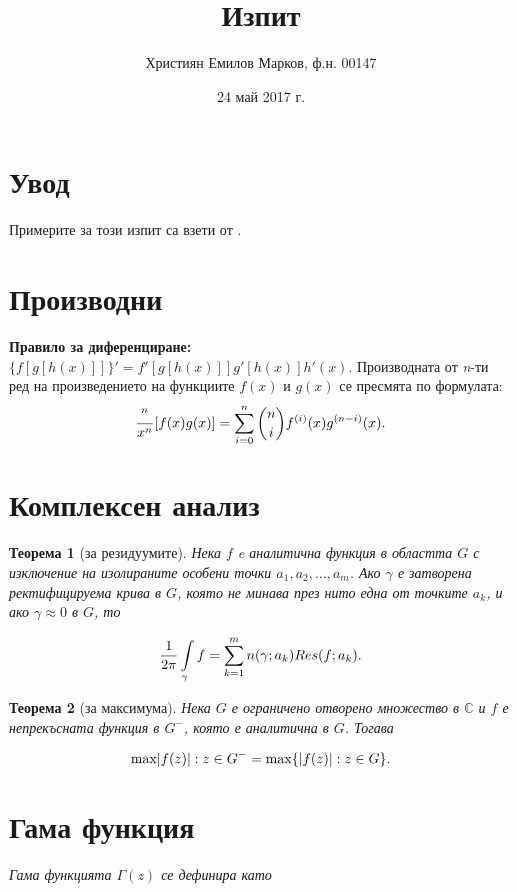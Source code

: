 \documentclass[leqno,11pt]{article}
\title{Изпит}
\author{Християн Емилов Марков, ф.н. 00147}
\date{24 май 2017 г.}
\newtheorem{theorem}{Теорема}
\let\partial\relax
\DeclareMathOperator{\partial}{d}
\let\i\relax
\DeclareMathOperator{\i}{i}
\begin{document}
\maketitle

\tableofcontents
\section*{Увод}
Примерите за този изпит са взети от \cite{sitectan}.
\section{Производни}
\textbf{Правило за диференциране:}
$\{f[g[h(x)]]\}' = f'[g[h(x)]]g'[h(x)]h'(x)$.
Производната от \textit{n}-ти ред на произведението на функциите $f(x)$ и $g(x)$ се пресмята по формулата:
\begin{equation}\label{eq:one}
\frac{\partial^n}{\partial x^n}[f(x)g(x)] = \sum\limits_{i=0}^{n}\binom{n}{i}f^{(i)}(x)g^{(n-i)}(x).
\end{equation}
\section{Комплексен анализ}
\begin{theorem}[за резидуумите]\label{th:one}
Нека $f$ e аналитична функция в областта $G$ с изключение на изолираните особени точки $a_1, a_2, \dots, a_m$. Ако $\gamma$ е затворена ректифицируема крива в $G$, която не минава през нито една от точките $a_k$, и ако $\gamma \approx 0$ в $G$, то
\end{theorem}
\begin{equation}
\frac{1}{2\pi \i} \int\limits_{\gamma}f = \sum\limits_{k=1}^{m}n(\gamma;a_{k})Res(f;a_k).
\end{equation}
\begin{theorem}[за максимума]\label{th:two}
Нека $G$ е ограничено отворено множество в $\mathbb{C}$ и $f$ е непрекъсната функция в $G^{-}$, която е аналитична в $G$. Тогава
\end{theorem}
\begin{equation}\notag
\text{max}{|f(z)|: z \in G^{-}} = \text{max}\{|f(z)|: z \in \partial G\}.
\end{equation}

\section{Гама функция}
\textit{Гама функцията $\Gamma(z)$ се дефинира като}
\end{document}
